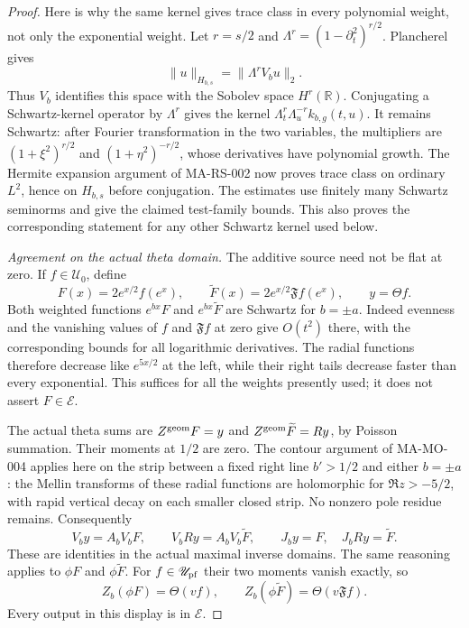 \begin{proof}
Here is why the same kernel gives trace class in every
polynomial weight, not only the exponential weight.
Let \(r=s/2\) and
\(\Lambda^r=(1-\partial_t^2)^{r/2}\). Plancherel gives
\[
   \|u\|_{H_{b,s}}
      =\|\Lambda^r V_bu\|_2.
 \tag{MA-MO.126}
\]
Thus \(V_b\) identifies this space with the Sobolev space
\(H^r(\mathbb R)\). Conjugating a Schwartz-kernel operator
by \(\Lambda^r\) gives the kernel
\(\Lambda_t^r\Lambda_u^{-r}k_{b,g}(t,u)\). It remains
Schwartz: after Fourier transformation in the two variables,
the multipliers are \((1+\xi^2)^{r/2}\) and
\((1+\eta^2)^{-r/2}\), whose derivatives have polynomial
growth. The Hermite expansion argument of MA-RS-002 now
proves trace class on ordinary \(L^2\), hence on
\(H_{b,s}\) before conjugation. The estimates use finitely
many Schwartz seminorms and give the claimed test-family
bounds. This also proves the corresponding statement for
any other Schwartz kernel used below.

\emph{Agreement on the actual theta domain.}
The additive source need not be flat at zero. If
\(f\in\mathscr U_0\), define
\[
 F(x)=2e^{x/2}f(e^x),\qquad
 \widetilde F(x)=2e^{x/2}\mathfrak Ff(e^x),\qquad
                         y=\Theta f.
 \tag{MA-MO.127}
\]
Both weighted functions \(e^{bx}F\) and
\(e^{bx}\widetilde F\) are Schwartz for \(b=\pm a\).
Indeed evenness and the vanishing values of \(f\) and
\(\mathfrak Ff\) at zero give \(O(t^2)\) there,
with the corresponding bounds for all logarithmic
derivatives. The radial functions therefore decrease like
\(e^{5x/2}\) at the left, while their right tails decrease
faster than every exponential. This suffices for all the
weights presently used; it does not assert \(F\in\mathcal E\).

The actual theta sums are
\(Z^{\rm geom}F=y\) and
\(Z^{\rm geom}\widetilde F=Ry\), by Poisson summation.
Their moments at \(1/2\) are zero. The contour argument
of MA-MO-004 applies here on the strip between a fixed
right line \(b'>1/2\) and either \(b=\pm a\): the
Mellin transforms of these radial functions are holomorphic
for \(\Re z>-5/2\), with rapid vertical decay on each
smaller closed strip. No nonzero pole residue remains.
Consequently
\[
        V_by=A_bV_bF,\qquad
        V_bRy=A_bV_b\widetilde F,
        \qquad J_by=F,\quad J_bRy=\widetilde F.
 \tag{MA-MO.128}
\]
These are identities in the actual maximal inverse domains.
The same reasoning applies to \(\phi F\) and
\(\phi\widetilde F\). For \(f\in\mathscr U_{\rm pf}\)
their two moments vanish exactly, so
\[
   Z_b(\phi F)=\Theta(vf),\qquad
   Z_b(\phi\widetilde F)=\Theta(v\mathfrak Ff).
 \tag{MA-MO.129}
\]
Every output in this display is in \(\mathcal E\).


\end{proof}
